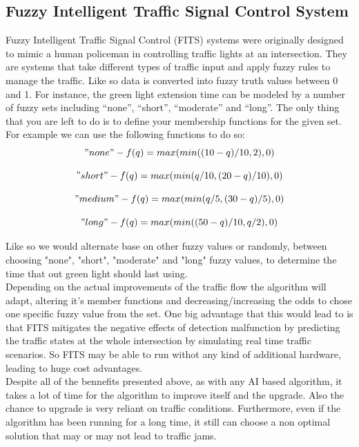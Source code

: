 \documentclass[17pt]{article}
\begin{document}
\pagebreak

\subsection{Fuzzy Intelligent Traffic Signal Control System}
\indent \indent
Fuzzy Intelligent Traffic Signal Control (FITS) \cite{Teo2010} \cite{Jin2017}
systems were originally designed to mimic a human policeman in controlling
traffic lights at an intersection. They are systems that take
different types of traffic input and apply fuzzy rules to 
manage the traffic. Like so data is converted into fuzzy truth
values between 0 and 1. For instance, the green light extension
time can be modeled by a number of fuzzy sets including “none”,
“short”, “moderate” and “long”. The only thing that you are left to do is
to define your membership functions for the given set. For example we can
use the following functions to do so:\\

\begin{equation}
    "none" - f(q) = max(min((10 - q) / 10, 2), 0)
\end{equation}

\begin{equation}
    "short" - f(q) = max(min(q / 10, (20 - q) / 10), 0)
\end{equation}

\begin{equation}
    "medium" - f(q) = max(min(q / 5, (30 - q) / 5), 0)
\end{equation}

\begin{equation}
    "long" - f(q) = max(min((50 - q) / 10, q / 2), 0)
\end{equation}


Like so we would alternate base on other fuzzy values or randomly, between
choosing "none", "short", "moderate" and "long" fuzzy values, to determine 
the time that out green light should last using.\\
\indent \indent
Depending on the actual improvements of the traffic flow the algorithm will 
adapt, altering it's member functions and decreasing/increasing the odds to 
chose one specific fuzzy value from the set. One big advantage that this would 
lead to is that FITS mitigates the negative effects of detection malfunction
by predicting the traffic states at the whole intersection by simulating real
time traffic scenarios. So FITS may be able to run withot any kind of additional
hardware, leading to huge cost advantages.\\
\indent \indent
Despite all of the bennefits presented above, as with any AI based algorithm,
it takes a lot of time for the algorithm to improve itself and the upgrade.
Also the chance to upgrade is very reliant on traffic conditions. Furthermore, 
even if the algorithm has been running for a long time, it still can choose a
non optimal solution that may or may not lead to traffic jams. 
\end{document}
